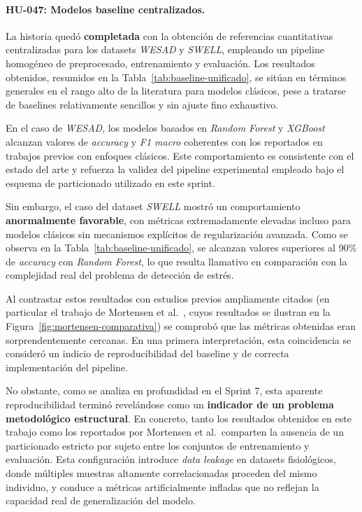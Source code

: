 \documentclass{report}
\begin{document}
\paragraph{HU-047: Modelos baseline centralizados.}
La historia quedó \textbf{completada} con la obtención de referencias cuantitativas centralizadas para los datasets \textit{WESAD} y \textit{SWELL}, empleando un pipeline homogéneo de preprocesado, entrenamiento y evaluación. Los resultados obtenidos, resumidos en la Tabla~\ref{tab:baseline-unificado}, se sitúan en términos generales en el rango alto de la literatura para modelos clásicos, pese a tratarse de baselines relativamente sencillos y sin ajuste fino exhaustivo.

En el caso de \textit{WESAD}, los modelos basados en \textit{Random Forest} y \textit{XGBoost} alcanzan valores de \emph{accuracy} y \emph{F1 macro} coherentes con los reportados en trabajos previos con enfoques clásicos. Este comportamiento es consistente con el estado del arte y refuerza la validez del pipeline experimental empleado bajo el esquema de particionado utilizado en este sprint.

Sin embargo, el caso del dataset \textit{SWELL} mostró un comportamiento \textbf{anormalmente favorable}, con métricas extremadamente elevadas incluso para modelos clásicos sin mecanismos explícitos de regularización avanzada. Como se observa en la Tabla~\ref{tab:baseline-unificado}, se alcanzan valores superiores al 90\% de \emph{accuracy} con \textit{Random Forest}, lo que resulta llamativo en comparación con la complejidad real del problema de detección de estrés.

Al contrastar estos resultados con estudios previos ampliamente citados (en particular el trabajo de Mortensen et al.~\cite{Mortensen2023SWELL}, cuyos resultados se ilustran en la Figura~\ref{fig:mortensen-comparativa}) se comprobó que las métricas obtenidas eran sorprendentemente cercanas. En una primera interpretación, esta coincidencia se consideró un indicio de reproducibilidad del baseline y de correcta implementación del pipeline.

No obstante, como se analiza en profundidad en el Sprint 7, esta aparente reproducibilidad terminó revelándose como un \textbf{indicador de un problema metodológico estructural}. En concreto, tanto los resultados obtenidos en este trabajo como los reportados por Mortensen et al.\ comparten la ausencia de un particionado estricto por sujeto entre los conjuntos de entrenamiento y evaluación. Esta configuración introduce \emph{data leakage} en datasets fisiológicos, donde múltiples muestras altamente correlacionadas proceden del mismo individuo, y conduce a métricas artificialmente infladas que no reflejan la capacidad real de generalización del modelo.
\end{document}
